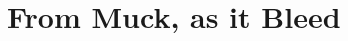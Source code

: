 \documentclass[../../main]{subfiles}
\begin{document}
\section{From Muck, as it Bleed} \label{sec:}
\end{document}
